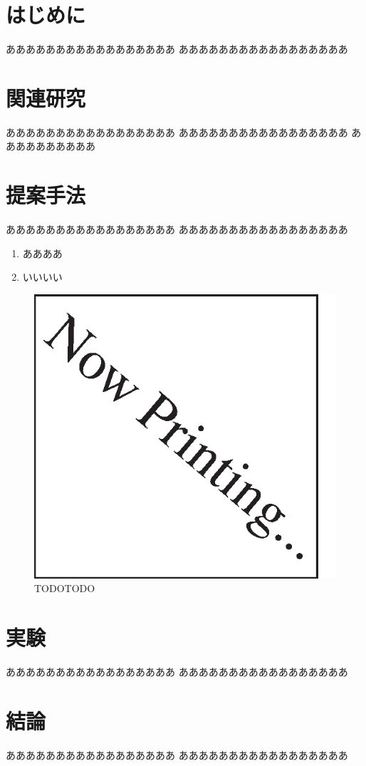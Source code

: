 \documentclass[twocolumn]{jarticle}
\title{
\jtitle{人工知能学会テンプレート}
\etitle{jsai report template}
}
\author{%
\jname{東大太郎\first}
\ename{Taro TODAI}
\and
\jname{第2筆者氏名\second}
\ename{Second Author's Name}
}
\begin{document}
\maketitle

\section{はじめに}
あああああああああああああああああ
あああああああああああああああああ

\section{関連研究}
あああああああああああああああああ
あああああああああああああああああ
ああああああああああ\cite{imagenet}

\section{提案手法}
あああああああああああああああああ
あああああああああああああああああ 

\begin{enumerate}
  \item ああああ
  \item いいいい
\end{enumerate} 

\begin{figure}[tbh]
  \centering
  \includegraphics[width=0.7\columnwidth]{figs/nowprinting.eps}
  \caption{TODOTODO}
  \label{fig:apc}
\end{figure}

\section{実験}
あああああああああああああああああ
あああああああああああああああああ

\section{結論}
あああああああああああああああああ
あああああああああああああああああ




\end{document}
